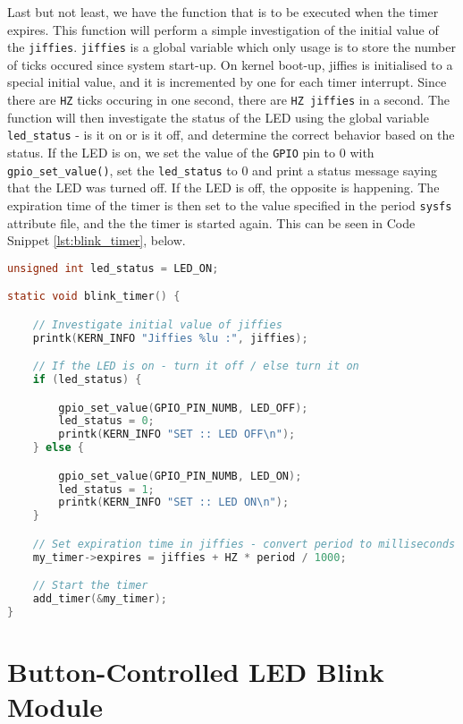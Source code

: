 \documentclass[a4paper,oneside,onecolumn]{article}
\newcommand{\code}[1]{\colorbox{codegray}{\texttt{#1}}}
\begin{document}
Last but not least, we have the function that is to be executed when the timer expires. This function will perform a simple investigation of the initial value of the \texttt{jiffies}. \texttt{jiffies} is a global variable which only usage is to store the number of ticks occured since system start-up. On kernel boot-up, jiffies is initialised to a special initial value, and it is incremented by one for each timer interrupt. Since there are \texttt{HZ} ticks occuring in one second, there are \texttt{HZ jiffies} in a second.
\newline
The function will then investigate the status of the LED using the global variable \code{led\_status} - is it on or is it off, and determine the correct behavior based on the status. If the LED is on, we set the value of the \texttt{GPIO} pin to 0 with \code{gpio\_set\_value()}, set the \code{led\_status} to 0 and print a status message saying that the LED was turned off. If the LED is off, the opposite is happening.
\newline
The expiration time of the timer is then set to the value specified in the period \texttt{sysfs} attribute file, and the the timer is started again. This can be seen in Code Snippet \ref{lst:blink_timer}, below.

\begin{lstlisting}[language=c, label={lst:blink_timer}, caption={The Blink Function to be Executed on Timer End}]
unsigned int led_status = LED_ON;

static void blink_timer() {

    // Investigate initial value of jiffies
    printk(KERN_INFO "Jiffies %lu :", jiffies);

    // If the LED is on - turn it off / else turn it on
    if (led_status) {

        gpio_set_value(GPIO_PIN_NUMB, LED_OFF);
        led_status = 0;
        printk(KERN_INFO "SET :: LED OFF\n");
    } else {

        gpio_set_value(GPIO_PIN_NUMB, LED_ON);
        led_status = 1;
        printk(KERN_INFO "SET :: LED ON\n");
    }

    // Set expiration time in jiffies - convert period to milliseconds
    my_timer->expires = jiffies + HZ * period / 1000;

    // Start the timer
    add_timer(&my_timer);
}
\end{lstlisting}

\section{Button-Controlled LED Blink Module}
\end{document}
